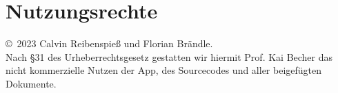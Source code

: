 
\chapter{Nutzungsrechte}

\copyright \, 2023 Calvin Reibenspieß und Florian Brändle.\\
Nach \S 31 des Urheberrechtsgesetz gestatten wir hiermit Prof. Kai Becher das nicht kommerzielle Nutzen der App, des Sourcecodes und aller beigefügten Dokumente.
